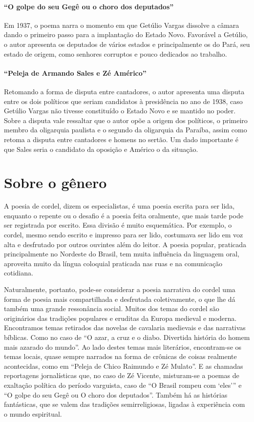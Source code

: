 \paragraph{``O golpe do seu Gegê ou o choro dos deputados''}

Em 1937, o poema narra o momento em que Getúlio Vargas dissolve a câmara
dando o primeiro passo para a implantação do Estado Novo. Favorável a
Getúlio, o autor apresenta os deputados de vários estados e
principalmente os do Pará, seu estado de origem, como senhores
corruptos e pouco dedicados ao trabalho.

\paragraph{``Peleja de Armando Sales e Zé Américo''}

Retomando a forma de disputa entre cantadores, o autor apresenta uma
disputa entre os dois políticos que seriam candidatos à presidência no
ano de 1938, caso Getúlio Vargas não tivesse constituído o Estado Novo
e se mantido no poder. Sobre a disputa vale ressaltar que o autor opõe
a origem dos políticos, o primeiro membro da oligarquia paulista e o
segundo da oligarquia da Paraíba, assim como retoma a disputa entre
cantadores e homens no sertão. Um dado importante é que Sales seria o
candidato da oposição e Américo o da situação. 


\section{Sobre o gênero}

A poesia de cordel, dizem os especialistas, é uma poesia escrita para
ser lida, enquanto o repente ou o desafio é a poesia feita oralmente,
que mais tarde pode ser registrada por escrito. Essa divisão é muito
esquemática. Por exemplo, o cordel, mesmo sendo escrito e impresso para
ser lido, costumava ser lido em voz alta e desfrutado por outros
ouvintes além do leitor. A poesia popular, praticada principalmente no
Nordeste do Brasil, tem muita influência da linguagem oral, aproveita
muito da língua coloquial praticada nas ruas e na comunicação
cotidiana. 

Naturalmente, portanto, pode-se considerar a poesia narrativa do cordel
uma forma de poesia mais compartilhada e desfrutada coletivamente, o
que lhe dá também uma grande ressonância social. Muitos dos temas do
cordel são originários das tradições populares e eruditas da Europa
medieval e moderna. Encontramos temas retirados das novelas de
cavalaria medievais e das narrativas bíblicas. Como no caso de
``O azar, a cruz e o diabo. Divertida história do
homem mais azarado do mundo''. Ao lado destes temas
mais literários, encontram-se os temas locais, quase sempre narrados na
forma de crônicas de coisas realmente acontecidas, como em
``Peleja de Chico Raimundo e Zé
Mulato''. E as chamadas reportagens jornalísticas que,
no caso de Zé Vicente, misturam-se a poemas de exaltação política do
período varguista, caso de ``O Brasil rompeu com
`eles''' e ``O golpe do seu Gegê ou O choro dos
deputados''. Também há as histórias fantásticas, que
se valem das tradições semirreligiosas, ligadas à experiência com o
mundo espiritual. 

